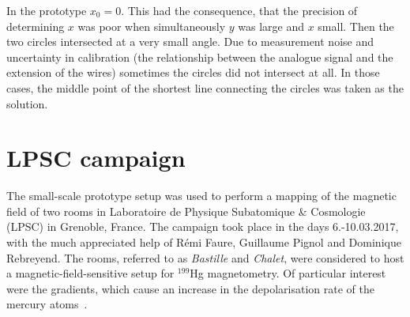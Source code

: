 In the prototype $x_0 = 0$. This had the consequence, that the precision of determining $x$ was poor when simultaneously $y$ was large and $x$ small. Then the two circles intersected at a very small angle. Due to measurement noise and uncertainty in calibration (the relationship between the analogue signal and the extension of the wires) sometimes the circles did not intersect at all. In those cases, the middle point of the shortest line connecting the circles was taken as the solution.










\section{LPSC campaign}
\label{sec:lpsc_campaign}
The small-scale prototype setup was used to perform a mapping of the magnetic field of two rooms in Laboratoire de Physique Subatomique \& Cosmologie (LPSC) in Grenoble, France. The campaign took place in the days 6.-10.03.2017, with the much appreciated help of Rémi Faure, Guillaume Pignol and Dominique Rebreyend. The rooms, referred to as \emph{Bastille} and \emph{Chalet}, were considered to host a magnetic-field-sensitive setup for ${}^{199}$Hg magnetometry. Of particular interest were the gradients, which cause an increase in the depolarisation rate of the mercury atoms~\cite{FertlThesis}.

